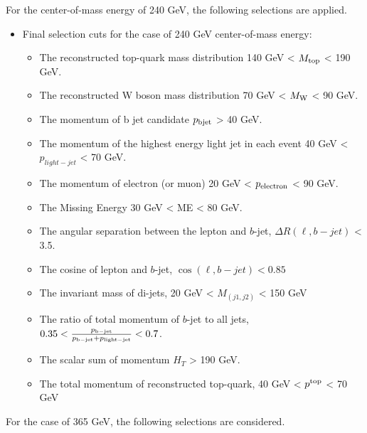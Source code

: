 \documentclass[11pt,onecolumn,english,showpacs,preprintnumbers,amsmath,amssymb,floatfix,nofootinbib]{revtex4-1}
\begin{document}
For the center-of-mass energy of 240 GeV, the following selections are applied.

\begin{itemize}
\item Final selection cuts for the case of 240 GeV center-of-mass energy:
\begin{itemize}
\item The reconstructed top-quark mass distribution 140 GeV < $M_{\rm top}$ < 190 GeV.
\item The reconstructed W boson mass distribution  70 GeV < $M_{\rm W}$ < 90 GeV.
\item The momentum of b jet candidate  $p_{\rm bjet}$ > 40 GeV.
\item The momentum of the highest energy light jet in each event 40 GeV < $p_{light-jet}$ < 70 GeV.
\item The momentum of electron (or muon) 20 GeV < $p_{\rm electron}$ < 90 GeV.
\item The Missing Energy 30 GeV < ME < 80 GeV.
\item The angular separation between the lepton and $b$-jet,  $\Delta R (\ell, b-jet)$ < 3.5.
\item The cosine of lepton and $b$-jet, $\cos(\ell, b-jet)  < 0.85$
\item The invariant mass of di-jets, 20 GeV < $M_{(j1, j2)}$ < 150 GeV
\item The ratio of total momentum of $b$-jet to all jets, $0.35 <  \frac{p_{\rm b-jet}}{ p_{\rm b-jet}+p_{\rm light-jet}} < 0.7$.
\item The scalar sum of momentum $H_T$ > 190 GeV.
\item The total momentum of reconstructed top-quark, 40 GeV < $p^{\rm top}$ < 70 GeV
\end{itemize}
\end{itemize}
 

For the case of 365 GeV, the following selections are considered.
\end{document}
